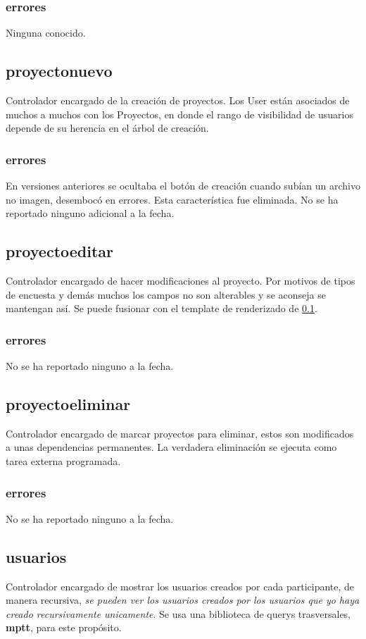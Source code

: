 \documentclass[10pt,a4paper]{book}
\begin{document}
	\subsubsection{errores}
	Ninguna conocido.
	
	
	\subsection{proyectonuevo}\label{proyectonuevo}
	Controlador encargado de la creación de proyectos. Los User están asociados de muchos a muchos con los Proyectos, en donde el rango de visibilidad de usuarios depende de su herencia en el árbol de creación.
	\subsubsection{errores}
	En versiones anteriores se ocultaba el botón de creación cuando subían un archivo no imagen, desembocó en errores. Esta característica fue eliminada. No se ha reportado ninguno adicional a la fecha.
	
	\subsection{proyectoeditar}
	Controlador encargado de hacer modificaciones al proyecto. Por motivos de tipos de encuesta y demás muchos los campos no son alterables y se aconseja se mantengan así. Se puede fusionar con el template de renderizado de \ref{proyectonuevo}.
	\subsubsection{errores}
	No se ha reportado ninguno a la fecha.
	
	\subsection{proyectoeliminar}
	Controlador encargado de marcar proyectos para eliminar, estos son modificados a unas dependencias permanentes. La verdadera eliminación se ejecuta como tarea externa programada.
	\subsubsection{errores}
	No se ha reportado ninguno a la fecha.
	
	\subsection{usuarios}
	Controlador encargado de mostrar los usuarios creados por cada participante, de manera recursiva, \textit{se pueden ver los usuarios creados por los usuarios que yo haya creado recursivamente unicamente}. Se usa una biblioteca de querys trasversales, \textbf{mptt}, para este propósito.
\end{document}
